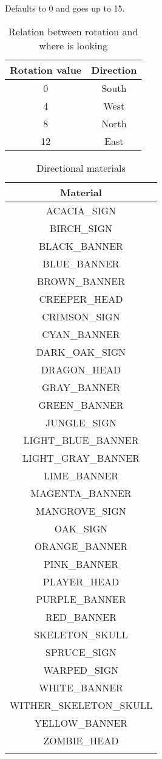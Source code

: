 Defaults to 0 and goes up to 15.

\begin{table}[H]
	\centering
	\begin{tabular}{ |c|c| }
		\hline
		Rotation value & Direction \\
		\hline
		0 & South \\
		4 & West \\
		8 & North \\
		12 & East \\
		\hline
	\end{tabular}
	\caption{Relation between rotation and where is looking}
\end{table}

\begin{longtable}{ |c| }
	\hline
	Material \\
	\hline
	\endhead
	ACACIA\_SIGN \\
	BIRCH\_SIGN \\
	BLACK\_BANNER \\
	BLUE\_BANNER \\
	BROWN\_BANNER \\
	CREEPER\_HEAD \\
	CRIMSON\_SIGN \\
	CYAN\_BANNER \\
	DARK\_OAK\_SIGN \\
	DRAGON\_HEAD \\
	GRAY\_BANNER \\
	GREEN\_BANNER \\
	JUNGLE\_SIGN \\
	LIGHT\_BLUE\_BANNER \\
	LIGHT\_GRAY\_BANNER \\
	LIME\_BANNER \\
	MAGENTA\_BANNER \\
	MANGROVE\_SIGN \\
	OAK\_SIGN \\
	ORANGE\_BANNER \\
	PINK\_BANNER \\
	PLAYER\_HEAD \\
	PURPLE\_BANNER \\
	RED\_BANNER \\
	SKELETON\_SKULL \\
	SPRUCE\_SIGN \\
	WARPED\_SIGN \\
	WHITE\_BANNER \\
	WITHER\_SKELETON\_SKULL \\
	YELLOW\_BANNER \\
	ZOMBIE\_HEAD \\
	\hline
	\caption{Directional materials}
\end{longtable}

